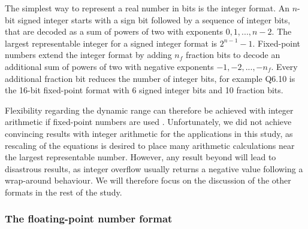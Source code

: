 \documentclass[draft]{agujournal2019}
\begin{document}
The simplest way to represent a real number in bits is the integer format. An $n$-bit signed integer starts with a sign bit followed by a sequence of integer bits, that are decoded as a sum of powers of two with exponents $0,1,...,n-2$. The largest representable integer for a signed integer format is $2^{n-1}-1$. Fixed-point numbers extend the integer format by adding $n_f$ fraction bits to decode an additional sum of powers of two with negative exponents $-1,-2,...,-n_f$. Every additional fraction bit reduces the number of integer bits, for example Q6.10 is the 16-bit fixed-point format with 6 signed integer bits and 10 fraction bits.

Flexibility regarding the dynamic range can therefore be achieved with integer arithmetic if fixed-point numbers are used \cite{Russell2017}. Unfortunately, we did not achieve convincing results with integer arithmetic for the applications in this study, as rescaling of the equations is desired to place many arithmetic calculations near the largest representable number. However, any result beyond will lead to disastrous results, as integer overflow usually returns a negative value following a wrap-around behaviour. We will therefore focus on the discussion of the other formats in the rest of the study.

\subsubsection{The floating-point number format}
\label{sec:floats}
\end{document}
